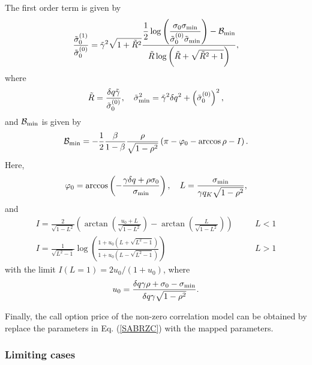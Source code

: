 \documentclass[12pt]{article}
\begin{document}
    The first order term is given by
    \begin{equation}
      \frac{\tilde{\sigma}_0^{(1)}}{\tilde{\sigma}_0^{(0)}}=\tilde{\gamma}^2\sqrt{1+\tilde{R}^2}
      \frac{\displaystyle \frac{1}{2}\log\left(\frac{\sigma_0\sigma_{{\rm min}}}{\tilde{\sigma}_0^{(0)}\tilde{\sigma}_{{\rm min}}}\right)
                                                -\mathcal{B}_{{\rm min}}}
      {\tilde{R}\log\bigg(\tilde{R}+\sqrt{\tilde{R}^2+1}\bigg)},
    \end{equation}
    where
    \begin{equation}
      \tilde{R} = \frac{\delta q\tilde{\gamma}}{\tilde{\sigma}_0^{(0)}},\quad
      \tilde{\sigma}_{{\rm min}}^2 = \tilde{\gamma}^2\delta q^2+\left(\tilde{\sigma}_0^{(0)}\right)^2,
    \end{equation}
    and $\mathcal{B}_{{\rm min}}$ is given by
    \begin{equation}
      \mathcal{B}_{{\rm min}}=-\frac{1}{2}\frac{\beta}{1-\beta}\frac{\rho}{\sqrt{1-\rho^2}}
      \left(\pi-\varphi_0-\arccos\rho-I\right).
    \end{equation}
    Here,
    \begin{equation}
      \varphi_0=\arccos\left(-\frac{\gamma\delta q+\rho\sigma_0}{\sigma_{{\rm min}}}\right),\quad
      L=\frac{\sigma_{{\rm min}}}{\gamma q_K\sqrt{1-\rho^2}},
    \end{equation}
    and
    \begin{eqnarray}
      I=\frac{2}{\sqrt{1-L^2}}\left(\arctan\left(\frac{u_0+L}{\sqrt{1-L^2}}\right)
                    -\arctan\left(\frac{L}{\sqrt{1-L^2}}\right)\right)       && \quad L < 1 \\
      I=\frac{1}{\sqrt{L^2-1}}\log\left(\frac{1+u_0\left(L+\sqrt{L^2-1}\right)}
                                               {1+u_0\left(L-\sqrt{L^2-1}\right)}\right)  && \quad L > 1
    \end{eqnarray}
    with the limit $I(L=1)=2u_0/(1+u_0)$, where
    \begin{equation}
      u_0=\frac{\delta q \gamma\rho+\sigma_0-\sigma_{{\rm min}}}{\delta q \gamma\sqrt{1-\rho^2}}.
    \end{equation}

    Finally, the call option price of the non-zero correlation model can be obtained by replace the parameters
    in Eq. (\ref{SABRZC}) with the mapped parameters.

    \subsubsection{Limiting cases}
\end{document}
